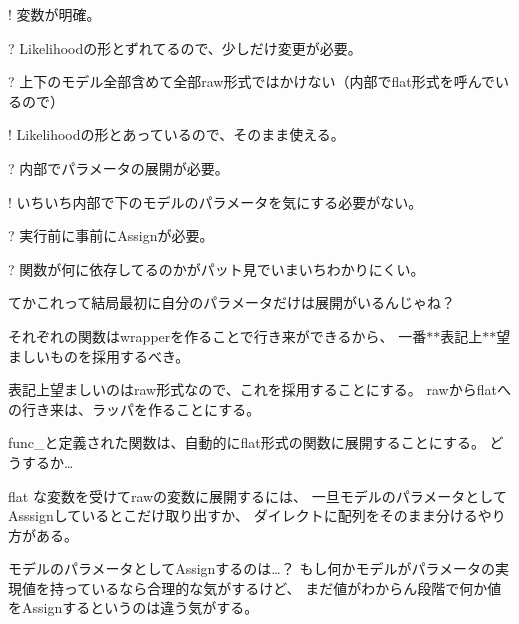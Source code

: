 \begin{DoxyEnumerate}
\item 
\begin{DoxyItemize}
\item ! 変数が明確。
\item ? Likelihoodの形とずれてるので、少しだけ変更が必要。
\item ? 上下のモデル全部含めて全部raw形式ではかけない（内部でflat形式を呼んでいるので）
\end{DoxyItemize}
\end{DoxyEnumerate}
\begin{DoxyEnumerate}
\item 
\begin{DoxyItemize}
\item ! Likelihoodの形とあっているので、そのまま使える。
\item ? 内部でパラメータの展開が必要。
\end{DoxyItemize}
\end{DoxyEnumerate}
\begin{DoxyEnumerate}
\item 
\begin{DoxyItemize}
\item ! いちいち内部で下のモデルのパラメータを気にする必要がない。
\item ? 実行前に事前に\+Assignが必要。
\item ? 関数が何に依存してるのかがパット見でいまいちわかりにくい。
\begin{DoxyItemize}
\item てかこれって結局最初に自分のパラメータだけは展開がいるんじゃね？
\end{DoxyItemize}
\end{DoxyItemize}
\end{DoxyEnumerate}

それぞれの関数はwrapperを作ることで行き来ができるから、 一番$\ast$$\ast$表記上$\ast$$\ast$望ましいものを採用するべき。

表記上望ましいのはraw形式なので、これを採用することにする。 rawからflatへの行き来は、ラッパを作ることにする。

func\+\_\+と定義された関数は、自動的にflat形式の関数に展開することにする。 どうするか…

flat な変数を受けてrawの変数に展開するには、 一旦モデルのパラメータとして\+Asssignしているとこだけ取り出すか、 ダイレクトに配列をそのまま分けるやり方がある。

モデルのパラメータとして\+Assignするのは…？ もし何かモデルがパラメータの実現値を持っているなら合理的な気がするけど、 まだ値がわからん段階で何か値を\+Assignするというのは違う気がする。

